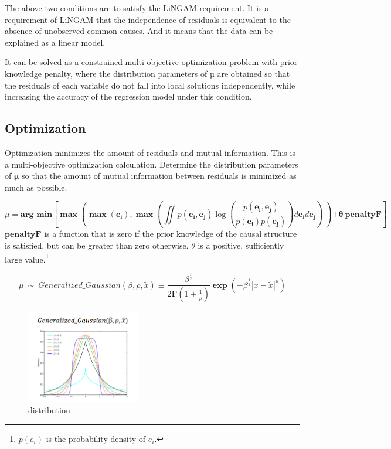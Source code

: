 \documentclass[pdftex]{article}
\begin{document}
The above two conditions are to satisfy the LiNGAM requirement. It is a requirement of LiNGAM that the independence of residuals is equivalent to the absence of unobserved common causes. And it means that the data can be explained as a linear model.

It can be solved as a constrained multi-objective optimization problem with prior knowledge penalty, where the distribution parameters of µ are obtained so that the residuals of each variable do not fall into local solutions independently, while increasing the accuracy of the regression model under this condition.

\subsection{Optimization}
Optimization minimizes the amount of residuals and mutual information.
This is a multi-objective optimization calculation.
Determine the distribution parameters of $\mathbf{\mu}$ so that the amount of mutual information between residuals is minimized as much as possible.

\begin{equation}
\mu = {\mathbf{\text{arg~min}}}\left\lbrack \mathbf{\max}\left( \mathbf{\max}\left( \mathbf{e}_{\mathbf{i}} \right)\mathbf{,}\mathbf{\max}\left( \iint_{}^{}{p\left( \mathbf{e}_{\mathbf{i}},\mathbf{e}_{\mathbf{j}} \right)\log}\left( \frac{p\left( \mathbf{e}_{\mathbf{i}},\mathbf{e}_{\mathbf{j}} \right)}{p\left( \mathbf{e}_{\mathbf{i}} \right)p\left( \mathbf{e}_{\mathbf{j}} \right)} \right)d\mathbf{e}_{\mathbf{i}}d\mathbf{e}_{\mathbf{j}} \right)\mathbf{\ } \right)\mathbf{+ \theta\ penaltyF} \right\rbrack
\end{equation}
$\textbf{penaltyF} $ is a function that is zero if the prior knowledge of the causal structure is satisfied, but can be greater than zero otherwise. $\theta$ is a positive, sufficiently large value.\footnote{$p(e_{i})$ is the probability density of $e_{i}$.}

\begin{equation}
\mu\ \sim\ Generalized\_ Gaussian(\beta,\rho,\widetilde{x}) \equiv \frac{\beta^{\frac{1}{2}}}{2\mathbf{\Gamma}(1 + \frac{1}{\rho})}\mathbf{\exp}\left( {- \beta}^{\frac{1}{2}}\left| x - \widetilde{x} \right|^{\rho} \right)
\end{equation}

\begin{figure}[H]
	\centering
	\includegraphics[width=5cm]{fig1.png}
	\caption{distribution}
\end{figure}
\end{document}
